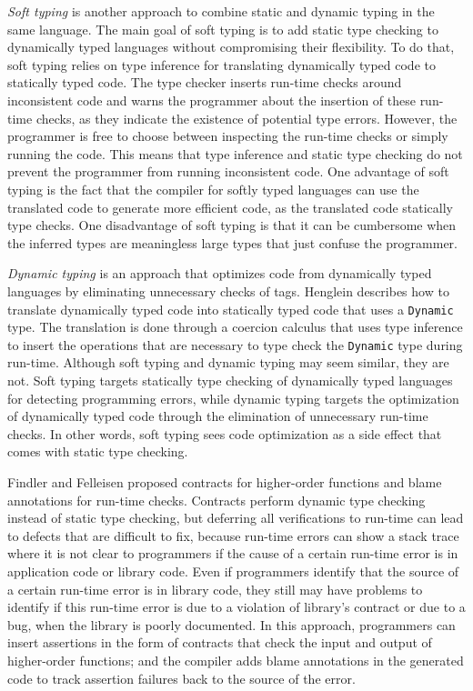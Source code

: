 \emph{Soft typing} \cite{cartwright1991soft} is another approach
to combine static and dynamic typing in the same language.
The main goal of soft typing is to add static type checking to
dynamically typed languages without compromising their flexibility.
To do that, soft typing relies on type inference for
translating dynamically typed code to statically typed code.
The type checker inserts run-time checks around inconsistent code and
warns the programmer about the insertion of these run-time checks,
as they indicate the existence of potential type errors.
However, the programmer is free to choose between inspecting the
run-time checks or simply running the code.
This means that type inference and static type checking do
not prevent the programmer from running inconsistent code.
One advantage of soft typing is the fact that the compiler for
softly typed languages can use the translated code to generate
more efficient code, as the translated code statically type checks.
One disadvantage of soft typing is that it can be cumbersome when
the inferred types are meaningless large types that just confuse the
programmer.

\emph{Dynamic typing} \cite{henglein1994dts} is an approach
that optimizes code from dynamically typed languages by eliminating
unnecessary checks of tags.
Henglein describes how to translate dynamically typed code into
statically typed code that uses a \texttt{Dynamic} type.
The translation is done through a coercion calculus that uses type
inference to insert the operations that are necessary to type check
the \texttt{Dynamic} type during run-time.
Although soft typing and dynamic typing may seem similar, they are not.
Soft typing targets statically type checking of dynamically typed
languages for detecting programming errors, while
dynamic typing targets the optimization of dynamically
typed code through the elimination of unnecessary run-time checks.
In other words, soft typing sees code optimization as a side effect
that comes with static type checking.

Findler and Felleisen \cite{findler2002chf} proposed contracts for
higher-order functions and blame annotations for run-time checks.
Contracts perform dynamic type checking instead of static type checking,
but deferring all verifications to run-time can lead to defects
that are difficult to fix, because run-time errors can show a
stack trace where it is not clear to programmers if the cause of a
certain run-time error is in application code or library code.
Even if programmers identify that the source of a certain run-time
error is in library code, they still may have problems to identify
if this run-time error is due to a violation of library's contract
or due to a bug, when the library is poorly documented.
In this approach, programmers can insert assertions in the form of
contracts that check the input and output of higher-order functions;
and the compiler adds blame annotations in the generated code
to track assertion failures back to the source of the error.

